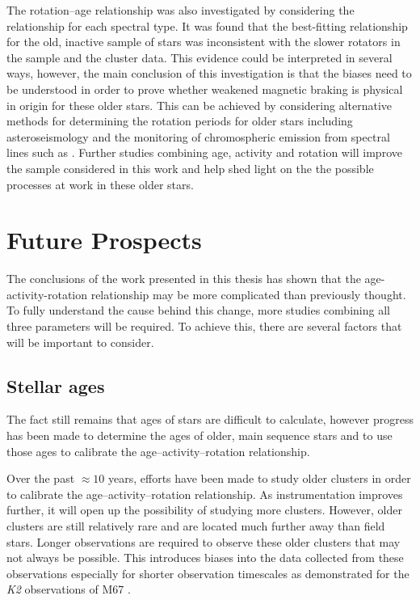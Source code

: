 The rotation--age relationship was also investigated by considering the relationship for each spectral type. It was found that the best-fitting relationship for the old, inactive sample of stars was inconsistent with the slower rotators in the sample and the cluster data. This evidence could be interpreted in several ways, however, the main conclusion of this investigation is that the biases need to be understood in order to prove whether weakened magnetic braking is physical in origin for these older stars. This can be achieved by considering alternative methods for determining the rotation periods for older stars including  asteroseismology and the monitoring of chromospheric emission from spectral lines such as \caII. Further studies combining age, activity and rotation will improve the sample considered in this work and help shed light on the the possible processes at work in these older stars.

\section{Future Prospects}

The conclusions of the work presented in this thesis has shown that the age-activity-rotation relationship may be more complicated than previously thought. To fully understand the cause behind this change, more studies combining all three parameters will be required. To achieve this, there are several factors that will be important to consider.

\subsection{Stellar ages}

The fact still remains that ages of stars are difficult to calculate, however progress has been made to determine the ages of older, main sequence stars and to use those ages to calibrate the age--activity--rotation relationship.

Over the past $\approx 10$ years, efforts have been made to study older clusters \citet{Meibom_etal_2015, Barnes_etal_2016} in order to calibrate the  age--activity--rotation relationship. As instrumentation improves further, it will open up the possibility of studying more clusters. However, older clusters are still relatively rare and are located much further away than field stars. Longer observations are required to observe these older clusters that may not always be possible. This introduces biases into the data collected from these observations especially for shorter observation timescales as demonstrated for the \textit{K2} observations of M67 \citep{Esselstein_etal_2018}.

